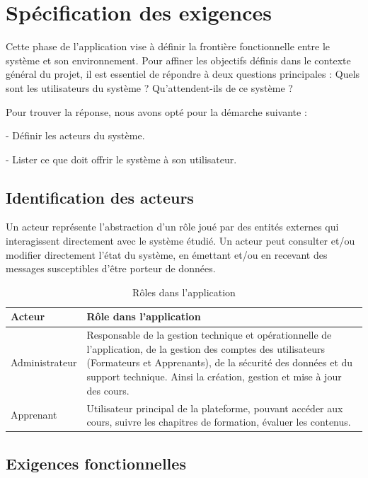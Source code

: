 \section{Spécification des exigences}

Cette phase de l’application vise à définir la frontière fonctionnelle entre le système et son environnement. Pour affiner les objectifs définis dans le contexte général du projet, il est essentiel de répondre à deux questions principales : Quels sont les utilisateurs du système ? Qu'attendent-ils de ce système ?

Pour trouver la réponse, nous avons opté pour la démarche suivante : 

- Définir les acteurs du système. 

- Lister ce que doit offrir le système à son utilisateur.


\subsection{Identification des acteurs}

Un acteur représente l’abstraction d’un rôle joué par des entités externes qui
interagissent directement avec le système étudié. Un acteur peut consulter et/ou
modifier directement l’état du système, en émettant et/ou en recevant des messages
susceptibles d'être porteur de données.

\begin{table}[htbp]
    \centering
    \begin{tabular}{|m{5cm}|m{10cm}|}
        \hline
        \textbf{Acteur} & \textbf{Rôle dans l'application} \\
        \hline
        Administrateur & Responsable de la gestion technique et opérationnelle de l'application, de la gestion des comptes des utilisateurs (Formateurs et Apprenants), de la sécurité des données et du support technique. Ainsi la création, gestion et mise à jour des cours. \\
        \hline
        Apprenant & Utilisateur principal de la plateforme, pouvant accéder aux cours, suivre les chapitres de formation, évaluer les contenus. \\
        \hline
    \end{tabular}
    \caption{Rôles dans l'application}
    \label{tab:roles}
\end{table}

\subsection{Exigences fonctionnelles}


